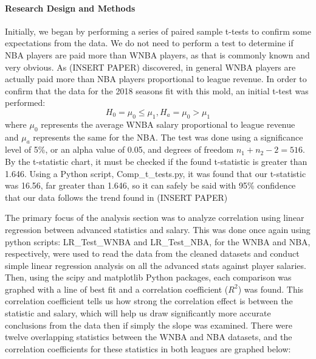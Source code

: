 \documentclass[12pt]{article}
\begin{document}
\paragraph{Research Design and Methods}
Initially, we began by performing a series of paired sample t-tests to confirm some expectations from the data. We do not need to perform a test to determine if NBA players are paid more than WNBA players, as that is commonly known and very obvious. As (INSERT PAPER) discovered, in general WNBA players are actually paid more than NBA players proportional to league revenue. In order to confirm that the data for the 2018 seasons fit with this mold, an initial t-test was performed:
$$H_0 = \mu_0 \leq \mu_1, H_a = \mu_0 > \mu_1$$
where $\mu_0$ represents the average WNBA salary proportional to league revenue and $\mu_a$ represents the same for the NBA. The test was done using a significance level of  5\%, or an alpha value of 0.05, and degrees of freedom $n_1 + n_2 - 2 = 516$. By the t-statistic chart, it must be checked if the found t-statistic is greater than 1.646. Using a Python script, Comp\_t\_tests.py, it was found that our t-statistic was 16.56, far greater than 1.646, so it can safely be said with 95\% confidence that our data follows the trend found in (INSERT PAPER)
\par
The primary focus of the analysis section was to analyze correlation using linear regression between advanced statistics and salary. This was done once again using python scripts: LR\_Test\_WNBA and LR\_Test\_NBA, for the WNBA and NBA, respectively, were used to read the data from the cleaned datasets and conduct simple linear regression analysis on all the advanced stats against player salaries. Then, using the scipy and matplotlib Python packages, each comparison was graphed with a line of best fit and a correlation coefficient ($R^2$) was found. This correlation coefficient tells us how strong the correlation effect is between the statistic and salary, which will help us draw significantly more accurate conclusions from the data then if simply the slope was examined. There were twelve overlapping statistics between the WNBA and NBA datasets, and the correlation coefficients for these statistics in both leagues are graphed below:
\end{document}
